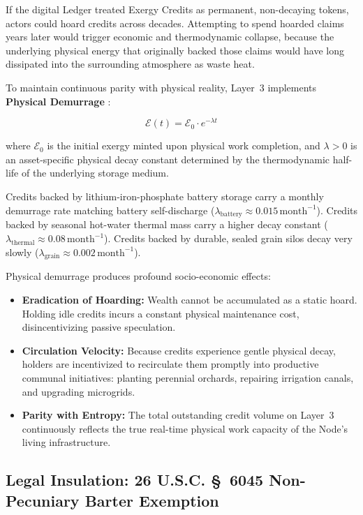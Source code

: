 If the digital Ledger treated Exergy Credits as permanent, non-decaying tokens, actors could hoard credits across decades. Attempting to spend hoarded claims years later would trigger economic and thermodynamic collapse, because the underlying physical energy that originally backed those claims would have long dissipated into the surrounding atmosphere as waste heat.

To maintain continuous parity with physical reality, Layer~3 implements \textbf{Physical Demurrage} \parencite{landauer2010}:

\begin{equation}
\mathcal{E}(t) = \mathcal{E}_0 \cdot e^{-\lambda t}
\label{eq:ch4_demurrage}
\end{equation}

where $\mathcal{E}_0$ is the initial exergy minted upon physical work completion, and $\lambda > 0$ is an asset-specific physical decay constant determined by the thermodynamic half-life of the underlying storage medium.

Credits backed by lithium-iron-phosphate battery storage carry a monthly demurrage rate matching battery self-discharge ($\lambda_{\mathrm{battery}} \approx 0.015\,\mathrm{month}^{-1}$). Credits backed by seasonal hot-water thermal mass carry a higher decay constant ($\lambda_{\mathrm{thermal}} \approx 0.08\,\mathrm{month}^{-1}$). Credits backed by durable, sealed grain silos decay very slowly ($\lambda_{\mathrm{grain}} \approx 0.002\,\mathrm{month}^{-1}$).

Physical demurrage produces profound socio-economic effects:
\begin{itemize}
  \item \textbf{Eradication of Hoarding:} Wealth cannot be accumulated as a static hoard. Holding idle credits incurs a constant physical maintenance cost, disincentivizing passive speculation.
  \item \textbf{Circulation Velocity:} Because credits experience gentle physical decay, holders are incentivized to recirculate them promptly into productive communal initiatives: planting perennial orchards, repairing irrigation canals, and upgrading microgrids.
  \item \textbf{Parity with Entropy:} The total outstanding credit volume on Layer~3 continuously reflects the true real-time physical work capacity of the Node's living infrastructure.
\end{itemize}

\subsection{Legal Insulation: 26 U.S.C. \texorpdfstring{\S~6045}{Section 6045} Non-Pecuniary Barter Exemption}
\label{sec:l3-tax}

